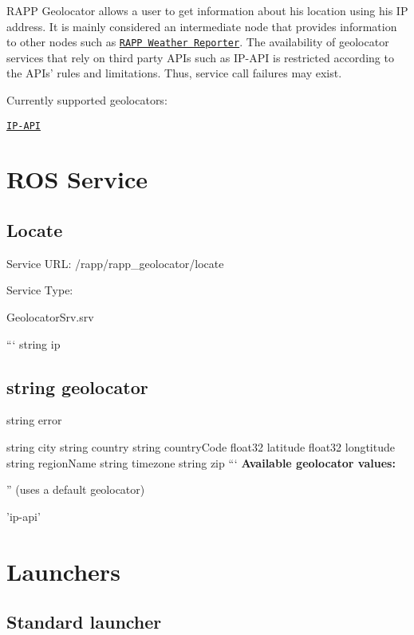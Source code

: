 R\-A\-P\-P Geolocator allows a user to get information about his location using his I\-P address. It is mainly considered an intermediate node that provides information to other nodes such as \href{https://github.com/rapp-project/rapp-platform/wiki/RAPP-Weather-Reporter}{\tt R\-A\-P\-P Weather Reporter}. The availability of geolocator services that rely on third party A\-P\-Is such as I\-P-\/\-A\-P\-I is restricted according to the A\-P\-Is' rules and limitations. Thus, service call failures may exist.

Currently supported geolocators\-:
\begin{DoxyItemize}
\item \href{http://ip-api.com/}{\tt I\-P-\/\-A\-P\-I}
\end{DoxyItemize}

\section*{R\-O\-S Service}

\subsection*{Locate}

Service U\-R\-L\-: {\ttfamily /rapp/rapp\-\_\-geolocator/locate}

Service Type\-:

Geolocator\-Srv.\-srv

``` string ip \subsection*{string geolocator }

string error

string city string country string country\-Code float32 latitude float32 longtitude string region\-Name string timezone string zip ``` {\bfseries Available geolocator values\-:}
\begin{DoxyItemize}
\item '' (uses a default geolocator)
\item 'ip-\/api'
\end{DoxyItemize}

\section*{Launchers}

\subsection*{Standard launcher}

